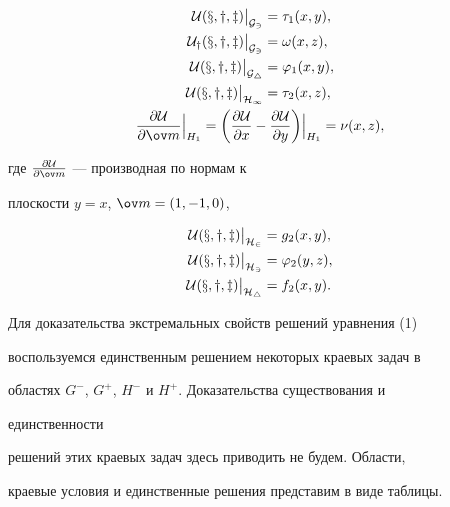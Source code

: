 \begin{gather}
\begin{align}
\cal U(x,y,z)\big|_{G_3}&=\tau_1(x,y), \\ 


\cal U_y(x,y,z)\big|_{G_3}&=\omega(x,z), \\ 


\cal U(x,y,z)\big|_{G_4}&=\varphi_1(x,y), \\ 


\cal U(x,y,z)\big|_{H_1}&=\tau_2(x,z), 


\end{align} 


\\ 


\frac{\partial\cal U}{\partial\ov m}\Big|_{H_1}= 


\bigg(\frac{\partial\cal U}{\partial x}- 


\frac{\partial\cal U}{\partial y}\bigg)\Big|_{H_1}= 


\nu(x,z), 


\end{gather} 


где $\frac{\partial\cal U}{\partial\ov m}$ --- производная по нормам к 


плоскости $y=x$, $\ov m=(1,-1,0)$, 


\begin{align} 


\cal U(x,y,z)\big|_{H_2}&=g_2(x,y), \\ 


\cal U(x,y,z)\big|_{H_3}&=\varphi_2(y,z), \\ 


\cal U(x,y,z)\big|_{H_4}&=f_2(x,y). 


\end{align} 


Для доказательства экстремальных свойств решений уравнения (1)  


воспользуемся единственным решением некоторых краевых задач в 


областях $G^-$, $G^+$, $H^-$ и $H^+$. Доказательства существования и 


единственности 


решений этих краевых задач здесь приводить не будем. Области,  


краевые условия и единственные решения представим в виде таблицы. 


\medskip 


 


